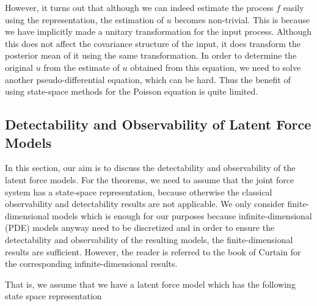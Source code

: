 \documentclass[journal]{IEEEtran}
\begin{document}
However, it turns out that although we can indeed estimate the process $f$ easily using the representation, the estimation of $u$ becomes non-trivial. This is because we have implicitly made a unitary transformation for the input process. Although this does not affect the covariance structure of the input, it does transform the posterior mean of it using the same transformation. In order to determine the original $u$ from the estimate of $u$ obtained from this equation, we need to solve another pseudo-differential equation, which can be hard. Thus the benefit of using state-space methods for the Poisson equation is quite limited. 

\subsection{Detectability and Observability of Latent Force Models}

In this section, our aim is to discuss the detectability and observability of the latent force models. For the theorems, we need to assume that the joint force system has a state-space representation, because otherwise the classical observability and detectability results \cite{Kalman:1960b,Kalman:1963,Anderson:1981} are not applicable. We only consider finite-dimensional models which is enough for our purposes because infinite-dimensional (PDE) models anyway need to be discretized and in order to ensure the detectability and observability of the resulting models, the finite-dimensional results are sufficient. However, the reader is referred to the book of Curtain \cite{Curtain:2012} for the corresponding infinite-dimensional results.

That is, we assume that we have a latent force model which has the following state space representation
\end{document}
